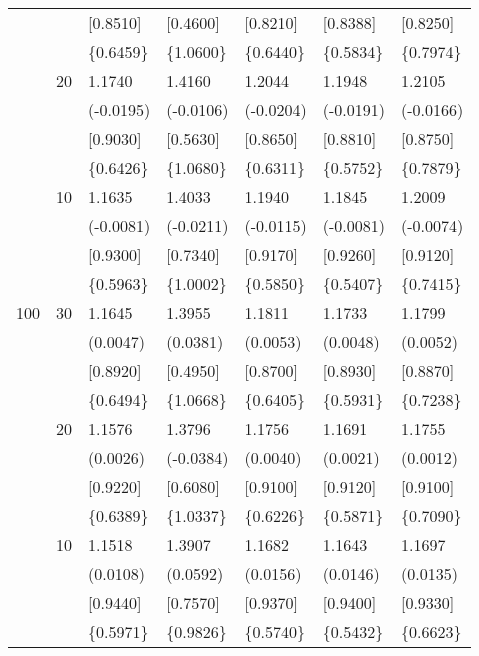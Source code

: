 \begin{table}[H]
{\begin{tabular}{c c | C{2.48cm} | C{2.48cm} | C{2.48cm} | C{2.48cm} | C{2.48cm} }
			&&[0.8510]&[0.4600]&[0.8210]&[0.8388]&[0.8250]\\
			&&\{0.6459\}&\{1.0600\}&\{0.6440\}&\{0.5834\}&\{0.7974\}\\
			&20&1.1740&1.4160&1.2044&1.1948&1.2105\\
			&&(-0.0195)&(-0.0106)&(-0.0204)&(-0.0191)&(-0.0166)\\
			&&[0.9030]&[0.5630]&[0.8650]&[0.8810]&[0.8750]\\
			&&\{0.6426\}&\{1.0680\}&\{0.6311\}&\{0.5752\}&\{0.7879\}\\
			&10&1.1635&1.4033&1.1940&1.1845&1.2009\\
			&&(-0.0081)&(-0.0211)&(-0.0115)&(-0.0081)&(-0.0074)\\
			&&[0.9300]&[0.7340]&[0.9170]&[0.9260]&[0.9120]\\
			&&\{0.5963\}&\{1.0002\}&\{0.5850\}&\{0.5407\}&\{0.7415\}\\
			\cmidrule(lr){1-7}
			100&30&1.1645&1.3955&1.1811&1.1733&1.1799\\
			&&(0.0047)&(0.0381)&(0.0053)&(0.0048)&(0.0052)\\
			&&[0.8920]&[0.4950]&[0.8700]&[0.8930]&[0.8870]\\
			&&\{0.6494\}&\{1.0668\}&\{0.6405\}&\{0.5931\}&\{0.7238\}\\
			&20&1.1576&1.3796&1.1756&1.1691&1.1755\\
			&&(0.0026)&(-0.0384)&(0.0040)&(0.0021)&(0.0012)\\
			&&[0.9220]&[0.6080]&[0.9100]&[0.9120]&[0.9100]\\
			&&\{0.6389\}&\{1.0337\}&\{0.6226\}&\{0.5871\}&\{0.7090\}\\
			&10&1.1518&1.3907&1.1682&1.1643&1.1697\\
			&&(0.0108)&(0.0592)&(0.0156)&(0.0146)&(0.0135)\\
			&&[0.9440]&[0.7570]&[0.9370]&[0.9400]&[0.9330]\\
			&&\{0.5971\}&\{0.9826\}&\{0.5740\}&\{0.5432\}&\{0.6623\}\\
			\bottomrule[1.5pt]
	\end{tabular}}
	\label{table:table S.1}
\end{table}

